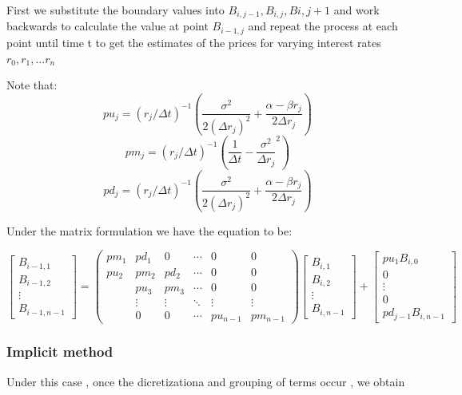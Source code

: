 \documentclass[12pt,a4paper]{article}
\begin{document}
First we substitute the boundary values into $B_{i,j-1}, B_{i,j}, B{i,j+1}$ and work backwards to calculate the value at point $B_{i-1,j}$ and repeat the process at each point until time t to get the estimates of the prices for varying interest rates $r_0,r_1,...r_n$ 

Note that:       
$$pu_{j}=(r_j/\Delta t)^{-1}(\frac{\sigma^{2}}{2(\Delta r_j)^{2}}+\frac{\alpha-\beta r_j}{2\Delta r_j})$$
$$pm_{j}=(r_j/\Delta t)^{-1}(\frac{1}{\Delta t}-\frac{\sigma^2}{\Delta r_j}^{2})$$
$$pd_{j}=(r_j/\Delta t)^{-1}(\frac{\sigma^{2}}{2(\Delta r_j)^{2}}+\frac{\alpha-\beta r_j}{2\Delta r_j})$$

Under the matrix formulation we have the equation to be:

$$\begin{bmatrix}
	B_{i-1,1} \\
	B_{i-1,2} \\
	\vdots \\       
	B_{i-1,n-1}
	\end{bmatrix}
=
\left( \begin{array}{cccccc}
pm_{1} & pd_{1} & 0 & \cdots  & 0 & 0\\
pu_{2} & pm_{2} & pd_{2} &\cdots & 0 & 0 \\
& pu_{3} & pm_{3} & \cdots & 0 & 0  \\
& \vdots &\vdots & \ddots & \vdots & \vdots \\ 
& 0 & 0 & \cdots & pu_{n-1} & pm_{n-1} \end{array} \right) 
%
\begin{bmatrix}
	B_{i,1} \\
	B_{i,2} \\
	\vdots \\       
	B_{i,n-1}
\end{bmatrix}
+
 \begin{bmatrix}
	pu_{1}B_{i,0} \\
	0 \\
	\vdots \\
	0 \\
	pd_{j-1}B_{i,n-1}
	\end{bmatrix}  
$$
 
 
 
\subsubsection{ Implicit method}

Under this case , once the dicretizationa and grouping of terms occur , we obtain
\end{document}
